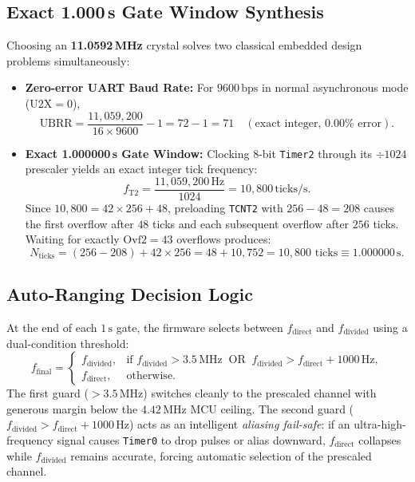 \documentclass[11pt,a4paper]{article}
\begin{document}
\subsection{Exact 1.000\,s Gate Window Synthesis}
Choosing an \textbf{11.0592\,MHz} crystal solves two classical embedded design problems simultaneously:
\begin{itemize}[leftmargin=1.5em]
    \item \textbf{Zero-error UART Baud Rate:} For $9600\,\text{bps}$ in normal asynchronous mode ($\text{U2X}=0$),
    \begin{equation}
        \text{UBRR} = \frac{11{,}059{,}200}{16 \times 9600} - 1 = 72 - 1 = 71 \quad (\text{exact integer, } 0.00\% \text{ error}).
    \end{equation}
    \item \textbf{Exact 1.000000\,s Gate Window:} Clocking 8-bit \texttt{Timer2} through its $\div 1024$ prescaler yields an exact integer tick frequency:
    \begin{equation}
        f_{\text{T2}} = \frac{11{,}059{,}200\,\text{Hz}}{1024} = 10{,}800\,\text{ticks/s}.
    \end{equation}
    Since $10{,}800 = 42 \times 256 + 48$, preloading \texttt{TCNT2} with $256 - 48 = 208$ causes the first overflow after $48$ ticks and each subsequent overflow after $256$ ticks. Waiting for exactly $\text{Ovf2} = 43$ overflows produces:
    \begin{equation}
        N_{\text{ticks}} = (256 - 208) + 42 \times 256 = 48 + 10{,}752 = 10{,}800\text{ ticks} \equiv 1.000000\,\text{s}.
    \end{equation}
\end{itemize}

\subsection{Auto-Ranging Decision Logic}
At the end of each $1\,\text{s}$ gate, the firmware selects between $f_{\text{direct}}$ and $f_{\text{divided}}$ using a dual-condition threshold:
\begin{equation}
    f_{\text{final}} =
    \begin{cases}
        f_{\text{divided}}, & \text{if } f_{\text{divided}} > 3.5\,\text{MHz} \;\;\text{OR}\;\; f_{\text{divided}} > f_{\text{direct}} + 1000\,\text{Hz}, \\
        f_{\text{direct}}, & \text{otherwise.}
    \end{cases}
\end{equation}
The first guard ($> 3.5\,\text{MHz}$) switches cleanly to the prescaled channel with generous margin below the $4.42\,\text{MHz}$ MCU ceiling. The second guard ($f_{\text{divided}} > f_{\text{direct}} + 1000\,\text{Hz}$) acts as an intelligent \emph{aliasing fail-safe}: if an ultra-high-frequency signal causes \texttt{Timer0} to drop pulses or alias downward, $f_{\text{direct}}$ collapses while $f_{\text{divided}}$ remains accurate, forcing automatic selection of the prescaled channel.
\end{document}

